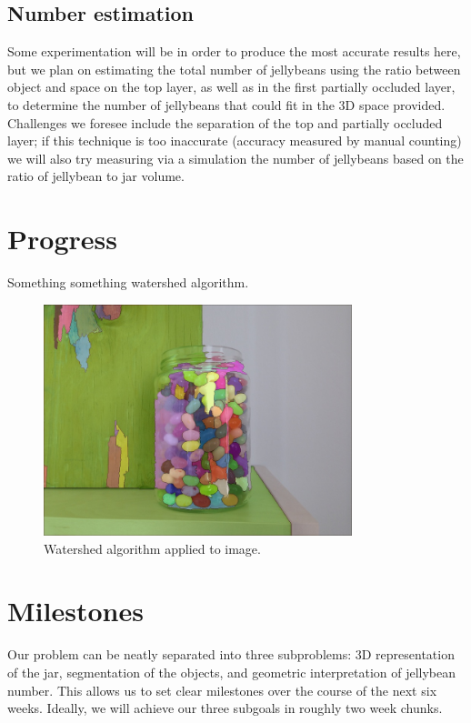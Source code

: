 \documentclass{article}
\begin{document}
\subsection*{Number estimation} 

Some experimentation will be in order to produce the most accurate results here, but we plan on estimating the total number of jellybeans using the ratio between object and space on the top layer, as well as in the first partially occluded layer, to determine the number of jellybeans that could fit in the 3D space provided. Challenges we foresee include the separation of the top and partially occluded layer; if this technique is too inaccurate (accuracy measured by manual counting) we will also try measuring via a simulation the number of jellybeans based on the ratio of jellybean to jar volume.

\section*{Progress}

Something something watershed algorithm.

\begin{figure}[h]
\centering
\includegraphics[width=0.8\textwidth]{../wshed.jpg}
\caption{Watershed algorithm applied to image.}
\end{figure}

\section*{Milestones}

Our problem can be neatly separated into three subproblems: 3D representation of the jar, segmentation of the objects, and geometric interpretation of jellybean number. This allows us to set clear milestones over the course of the next six weeks. Ideally, we will achieve our three subgoals in roughly two week chunks.
\end{document}
